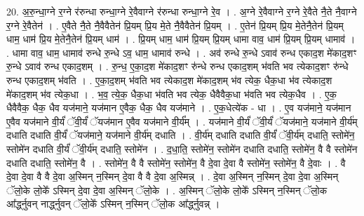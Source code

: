 \documentclass[17pt]{extarticle}
\begin{document}
20. अ॒रु॒न्धा॒ग्ने र॒ग्ने र॑रुन्धा रुन्धा॒ग्ने रे॒वैवाग्ने र॑रुन्धा रुन्धा॒ग्ने रे॒व । . अ॒ग्ने रे॒वैवाग्ने र॒ग्ने रे॒वैते नै॒ते नै॒वाग्ने र॒ग्ने रे॒वैतेन॑ । . ए॒वैते नै॒ते नै॒वैवैतेन॑ प्रि॒यम् प्रि॒य मे॒ते नै॒वैवैतेन॑ प्रि॒यम् । . ए॒तेन॑ प्रि॒यम् प्रि॒य मे॒तेनै॒तेन॑ प्रि॒यम् धाम॒ धाम॑ प्रि॒य मे॒तेनै॒तेन॑ प्रि॒यम् धाम॑ । . प्रि॒यम् धाम॒ धाम॑ प्रि॒यम् प्रि॒यम् धामा वाव॒ धाम॑ प्रि॒यम् प्रि॒यम् धामाव॑ । . धामा वाव॒ धाम॒ धामाव॑ रुन्धे रु॒न्धे ऽव॒ धाम॒ धामाव॑ रुन्धे । . अव॑ रुन्धे रु॒न्धे ऽवाव॑ रुन्ध एकाद॒श मे॑काद॒शꣳ रु॒न्धे ऽवाव॑ रुन्ध एकाद॒शम् । . रु॒न्ध॒ ए॒का॒द॒श मे॑काद॒शꣳ रु॑न्धे रुन्ध एकाद॒शम् भ॑वति भव त्येकाद॒शꣳ रु॑न्धे रुन्ध एकाद॒शम् भ॑वति । . ए॒का॒द॒शम् भ॑वति भव त्येकाद॒श मे॑काद॒शम् भ॑व त्येक॒ धैक॒धा भ॑व त्येकाद॒श मे॑काद॒शम् भ॑व त्येक॒धा । . भ॒व॒ त्ये॒क॒ धैक॒धा भ॑वति भव त्येक॒ धैवैवैक॒धा भ॑वति भव त्येक॒धैव । . ए॒क॒ धैवैवैक॒ धैक॒ धैव यज॑माने॒ यज॑मान ए॒वैक॒ धैक॒ धैव यज॑माने । . ए॒क॒धेत्ये॑क - धा । . ए॒व यज॑माने॒ यज॑मान ए॒वैव यज॑माने वी॒र्यं॑ ॅवी॒र्यं॑ ॅयज॑मान ए॒वैव यज॑माने वी॒र्य᳚म् । . यज॑माने वी॒र्यं॑ ॅवी॒र्यं॑ ॅयज॑माने॒ यज॑माने वी॒र्य॑म् दधाति दधाति वी॒र्यं॑ ॅयज॑माने॒ यज॑माने वी॒र्य॑म् दधाति । . वी॒र्य॑म् दधाति दधाति वी॒र्यं॑ ॅवी॒र्य॑म् दधाति॒ स्तोमे॑न॒ स्तोमे॑न दधाति वी॒र्यं॑ ॅवी॒र्य॑म् दधाति॒ स्तोमे॑न । . द॒धा॒ति॒ स्तोमे॑न॒ स्तोमे॑न दधाति दधाति॒ स्तोमे॑न॒ वै वै स्तोमे॑न दधाति दधाति॒ स्तोमे॑न॒ वै । . स्तोमे॑न॒ वै वै स्तोमे॑न॒ स्तोमे॑न॒ वै दे॒वा दे॒वा वै स्तोमे॑न॒ स्तोमे॑न॒ वै दे॒वाः । . वै दे॒वा दे॒वा वै वै दे॒वा अ॒स्मिन् न॒स्मिन् दे॒वा वै वै दे॒वा अ॒स्मिन्न् । . दे॒वा अ॒स्मिन् न॒स्मिन् दे॒वा दे॒वा अ॒स्मिन् ॅलो॒के लो॒के᳚ ऽस्मिन् दे॒वा दे॒वा अ॒स्मिन् ॅलो॒के । . अ॒स्मिन् ॅलो॒के लो॒के᳚ ऽस्मिन् न॒स्मिन् ॅलो॒क आ᳚र्द्ध्नुवन् नार्द्ध्नुवन् ॅलो॒के᳚ ऽस्मिन् न॒स्मिन् ॅलो॒क आ᳚र्द्ध्नुवन्न् । \newline
\end{document}
